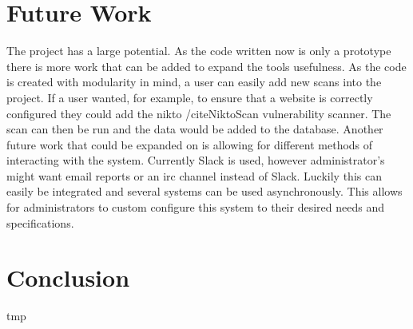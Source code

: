 \documentclass[12pt]{article}
\begin{document}
\section{Future Work}
The project has a large potential. As the code written now is only a prototype there is more work that can be added to expand the tools usefulness. As the code is created with modularity in mind, a user can easily add new scans into the project. If a user wanted, for example, to ensure that a website is correctly configured they could add the nikto /cite{NiktoScan} vulnerability scanner. The scan can then be run and the data would be added to the database. Another future work that could be expanded on is allowing for different methods of interacting with the system. Currently Slack is used, however administrator's might want email reports or an irc channel instead of Slack. Luckily this can easily be integrated and several systems can be used asynchronously. This allows for administrators to custom configure this system to their desired needs and specifications.

\section{Conclusion}
tmp



\newpage


\end{document}
